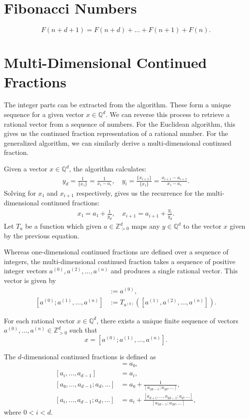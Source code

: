 \section{Fibonacci Numbers}

\[
  F(n + d + 1) = F(n + d) + \dots + F(n + 1) + F(n).
\]

\section{Multi-Dimensional Continued Fractions}

The integer parts can be extracted from the algorithm.
These form a unique sequence for a given vector $x ∈ ℚ^d$.
We can reverse this process to retrieve a rational vector from a sequence of numbers.
For the Euclidean algorithm, this gives us the continued fraction representation of a rational number.
For the generalized algorithm, we can similarly derive a multi-dimensional continued fraction.

Given a vector $x ∈ ℚ^d$, the algorithm calculates:
\begin{align*}
  y_d
  = \frac{1}{\{x₁\}}
  = \frac{1}{x₁ - a₁},
  \quad y_i
  = \frac{\{x_{i+1}\}}{\{x₁\}}
  = \frac{x_{i+1} - a_{i+1}}{x₁ - a₁}.
\end{align*}
Solving for $x₁$ and $x_{i+1}$ respectively,
gives us the recurrence for the multi-dimensional continued fractions:
\begin{align*}
  x₁ = a₁ + \frac{1}{y_d},
  \quad x_{i+1} = a_{i+1} + \frac{y_i}{y_d}.
\end{align*}
Let $T_a$ be a function which given $a ∈ ℤ_{> 0}^d$ maps any $y ∈ ℚ^d$ to the vector $x$ given by
the previous equation.

Whereas one-dimensional continued fractions are defined over a sequence of integers,
the multi-dimensional continued fraction takes a sequence of positive integer vectors
$a^{(0)}, a^{(2)}, \dots, a^{(n)}$ and produces a single rational vector.
This vector is given by
\begin{align*}
  [a^{(0)}] & := a^{(0)}, \\
  [a^{(0)}; a^{(1)}, \dots, a^{(n)}] & := T_{a^{(0)}}([a^{(1)}, a^{(2)}, \dots, a^{(n)}]).
\end{align*}

\begin{lemma}
  For each rational vector $x ∈ ℚ^d$, there exists a unique finite sequence of vectors $a^{(0)}, \dots, a^{(n)} ∈ ℤ_{> 0}^d$
  such that
  \[
    x = [a^{(0)}; a^{(1)}, \dots, a^{(n)}].
  \]
\end{lemma}

The $d$-dimensional continued fractions is defined as
\begin{align*}
  [a₀, \dots, a_{d-1}] & = a₀, \\
  [a_i, \dots, a_{d-1}] & = a_i, \\
  [a₀, \dots, a_{d-1}; a_d, \dots]
  & = a₀ + \frac{1}{[a_{2d-1}; a_{2d}, \dots]}, \\
  [a_i, \dots, a_{d-1}; a_d, \dots]
  & = a_i + \frac{[a_{d+i}, \dots, a_{2d - 1}; a_d, \dots]}{[a_{2d-1}; a_{2d}, \dots]},
\end{align*}
where $0 < i < d$.
